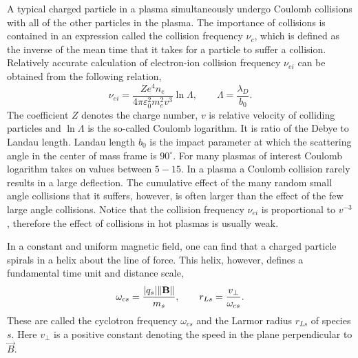 A typical charged particle in a plasma simultaneously undergo Coulomb collisions with all of the other particles in the plasma. The importance of collisions is contained in an expression called the collision frequency $ \nu_c $, which is defined as the inverse of the mean time that it takes for a particle to suffer a collision. Relatively accurate calculation of electron-ion collision frequency $ \nu_{ei} $ can be obtained from the following relation,
\begin{equation}
\label{2.1.6}
\nu_{ei} = \frac{Z e^4 n_e}{4 \pi \varepsilon_0^2 m_e^2 v^3} \ln{\Lambda}, \qquad \Lambda = \frac{\lambda_D}{b_0}.
\end{equation}
The coefficient $ Z $ denotes the charge number, $ v $ is relative velocity of colliding particles and $ \ln \Lambda $ is the so-called Coulomb logarithm. It is ratio of the Debye to Landau length. Landau length $ b_0 $ is the impact parameter at which the scattering angle in the center of mass frame is $ 90^\circ $. For many plasmas of interest Coulomb logarithm takes on values between $ 5 - 15 $. In a plasma a Coulomb collision rarely results in a large deflection. The cumulative effect of the many random small angle collisions that it suffers, however, is often larger than the effect of the few large angle collisions. Notice that the collision frequency $ \nu_{ei} $ is proportional to $ v^{-3} $, therefore the effect of collisions in hot plasmas is usually weak.

In a constant and uniform magnetic field, one can find that a charged particle spirals in a helix about the line of force. This helix, however, defines a fundamental time unit and distance scale,
\begin{equation}
\label{2.1.7}
\omega_{cs} = \frac{\lvert q_{s}\rvert \lVert\mathbf{B}\rVert}{m_{s}}, \qquad r_{Ls} = \frac{v_\perp}{\omega_{cs}}.
\end{equation}
These are called the cyclotron frequency $ \omega_{cs} $ and the Larmor radius $ r_{Ls} $ of species $ s $. Here $ v_\perp $ is a positive constant denoting the speed in the plane perpendicular to $ \vec{B} $.
